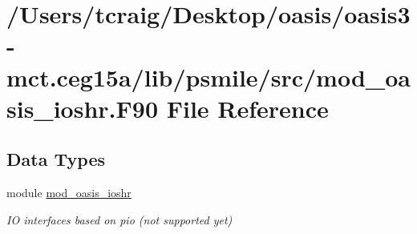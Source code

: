 \hypertarget{mod__oasis__ioshr_8_f90}{\section{/\+Users/tcraig/\+Desktop/oasis/oasis3-\/mct.ceg15a/lib/psmile/src/mod\+\_\+oasis\+\_\+ioshr.F90 File Reference}
\label{mod__oasis__ioshr_8_f90}
}
\subsection*{Data Types}
\begin{DoxyCompactItemize}
\item 
module \hyperlink{classmod__oasis__ioshr}{mod\+\_\+oasis\+\_\+ioshr}
\begin{DoxyCompactList}\small\item\em I\+O interfaces based on pio (not supported yet) \end{DoxyCompactList}\end{DoxyCompactItemize}
